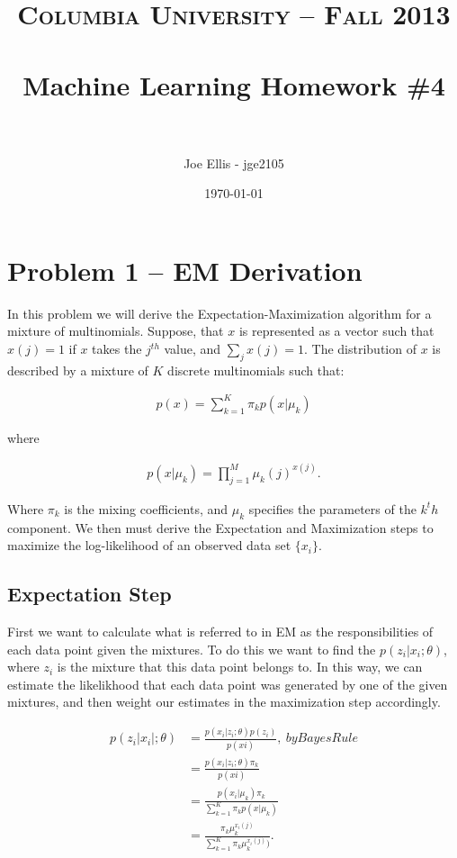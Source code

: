 \documentclass[paper=a4, fontsize=11pt]{scrartcl} %
\title{	
\normalfont \normalsize 
\textsc{Columbia University -- Fall 2013} \\ [25pt] %
\horrule{0.5pt} \\[0.4cm] %
\huge Machine Learning Homework \#4\\ %
\horrule{2pt} \\[0.5cm] %
}
\author{Joe Ellis - jge2105} %
\date{\normalsize\today} %
\begin{document}
\maketitle %


\section{Problem 1 -- EM Derivation}
In this problem we will derive the Expectation-Maximization algorithm for a mixture of multinomials.
Suppose, that $x$ is represented as a vector such that $x(j) = 1$ if $x$ takes the $j^{th}$ value, and $\sum_j x(j) = 1$.
The distribution of $x$ is described by a mixture of $K$ discrete multinomials such that:

\begin{align}
p(x) = \sum_{k=1}^K \pi_k p(x|\mu_k)
\end{align}

where 

\begin{align}
p(x|\mu_k) = \prod_{j=1}^M \mu_k(j)^{x(j)}.
\end{align}

Where $\pi_k$ is the mixing coefficients, and $\mu_k$ specifies the parameters of the $k^th$ component.
We then must derive the Expectation and Maximization steps to maximize the log-likelihood of an observed data set $\{x_i\}$.

\subsection{Expectation Step}
First we want to calculate what is referred to in EM as the responsibilities of each data point given the mixtures.
To do this we want to find the $p(z_i|x_i;\theta)$, where $z_i$ is the mixture that this data point belongs to.
In this way, we can estimate the likelikhood that each data point was generated by one of the given mixtures, and then weight our estimates in the maximization step accordingly.

\begin{align}
p(z_i|x_i|;\theta) &= \frac{p(x_i|z_i;\theta)p(z_i)}{p(xi)},	\ by Bayes Rule \\
&= \frac{p(x_i|z_i;\theta)\pi_k}{p(xi)} \\
&= \frac{p(x_i|\mu_k)\pi_k}{\sum_{k=1}^K \pi_k p(x|\mu_k)} \\
&= \frac{\pi_k\mu_k^{x_i(j)}}{\sum_{k=1}^K \pi_k\mu_k^{x_i(j)})}. \\
\end{align}
\end{document}
